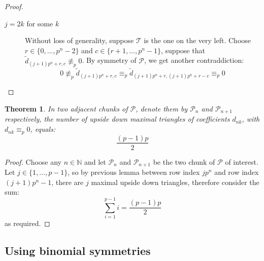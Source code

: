 \documentclass[11pt,a4paper]{article} %
\newtheorem{theorem}{Theorem}[section]
\begin{document}
\begin{proof}
\begin{itemize}
\begin{description}
                    \item[$j=2k$ for some $k$] Without loss of generality, suppose  $\mathcal{T}$ is the one on the very left. 
                    Choose $r \in\lbrace 0,\ldots,p^n-2\rbrace$ and $c \in\lbrace r+1,\ldots,p^n-1\rbrace$,
                    suppose that $\tilde{d}_{(j+1) p^n +r, c}\not\equiv_{p}0$. By symmetry of $\mathcal{P}$, we get another contraddiction: 
                    \begin{displaymath}
                        0\not\equiv_{p}\tilde{d}_{(j+1) p^n +r, c} \equiv_{p} \tilde{d}_{(j+1) p^n +r, (j+1) p^n +r-c}\equiv_{p}0
                    \end{displaymath}
                \end{description}
        \end{itemize}
    \end{proof}
    

    \begin{theorem}
        In two adjacent chunks of $\mathcal{P}$, denote them by $\mathcal{P}_n$
        and $\mathcal{P}_{n+1}$ respectively, the
        number of upside down maximal triangles of coefficients $d_{nk}$, with
        $d_{nk} \equiv_p 0$, equals:
        \begin{displaymath}
            \frac{(p-1)p}{2}
        \end{displaymath}
    \end{theorem}

    \begin{proof}
        Choose any $n\in\mathbb{N}$ and let $\mathcal{P}_n$ and $\mathcal{P}_{n+1}$
        be the two chunk of $\mathcal{P}$ of interest. Let $j\in\lbrace 1, \ldots, p-1 \rbrace$, so
        by previous lemma between row index $j p^n$ and
        row index $(j+1)p^n -1$, there are $j$ maximal upside down triangles, therefore consider the sum:
        \begin{displaymath}
            \sum_{i=1}^{p-1}{i} = \frac{(p-1)p}{2}
        \end{displaymath}
        as required.

    \end{proof}

    \subsection{Using binomial symmetries}
\end{document}
